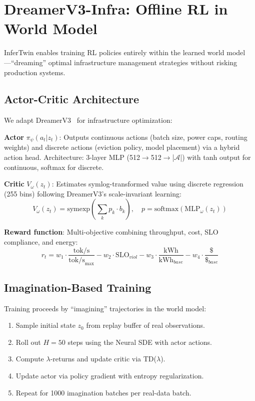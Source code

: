 \documentclass[conference,10pt]{IEEEtran}
\begin{document}
\section{DreamerV3-Infra: Offline RL in World Model}
\label{sec:dreamer}

InferTwin enables training RL policies entirely within the learned world model---``dreaming'' optimal infrastructure management strategies without risking production systems.

\subsection{Actor-Critic Architecture}

We adapt DreamerV3~\cite{hafner2023dreamerv3} for infrastructure optimization:

\textbf{Actor} $\pi_\psi(a_t | z_t)$: Outputs continuous actions (batch size, power caps, routing weights) and discrete actions (eviction policy, model placement) via a hybrid action head. Architecture: 3-layer MLP (512$\to$512$\to$|$\mathcal{A}$|) with tanh output for continuous, softmax for discrete.

\textbf{Critic} $V_\omega(z_t)$: Estimates symlog-transformed value using discrete regression (255 bins) following DreamerV3's scale-invariant learning:
\begin{equation}
V_\omega(z_t) = \text{symexp}\left(\sum_{k} p_k \cdot b_k\right), \quad p = \text{softmax}(\text{MLP}_\omega(z_t))
\end{equation}

\textbf{Reward function}: Multi-objective combining throughput, cost, SLO compliance, and energy:
\begin{equation}
r_t = w_1 \cdot \frac{\text{tok/s}}{\text{tok/s}_{\max}} - w_2 \cdot \text{SLO}_{viol} - w_3 \cdot \frac{\text{kWh}}{\text{kWh}_{base}} - w_4 \cdot \frac{\$}{\$_{base}}
\end{equation}

\subsection{Imagination-Based Training}

Training proceeds by ``imagining'' trajectories in the world model:
\begin{enumerate}
\item Sample initial state $z_0$ from replay buffer of real observations.
\item Roll out $H=50$ steps using the Neural SDE with actor actions.
\item Compute $\lambda$-returns and update critic via TD($\lambda$).
\item Update actor via policy gradient with entropy regularization.
\item Repeat for 1000 imagination batches per real-data batch.
\end{enumerate}
\end{document}
